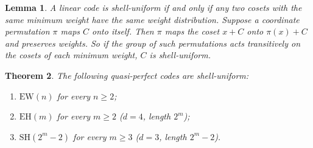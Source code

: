 \documentclass[11pt]{article}
\newtheorem{theorem}{Theorem}
\newtheorem{lemma}[theorem]{Lemma}
\theoremstyle{definition}
\theoremstyle{remark}
\begin{document}
\begin{lemma}\label{lem:coset}
A linear code is shell-uniform if and only if any two cosets with the same
minimum weight have the same weight distribution. Suppose a coordinate
permutation $\pi$ maps $C$ onto itself. Then $\pi$ maps the coset $x+C$ onto
$\pi(x)+C$ and preserves weights. So if the group of such permutations acts
transitively on the cosets of each minimum weight, $C$ is shell-uniform.
\end{lemma}

\begin{theorem}\label{thm:uniform}
The following quasi-perfect codes are shell-uniform:
\begin{enumerate}
\item $\mathrm{EW}(n)$ for every $n\ge 2$;
\item $\mathrm{EH}(m)$ for every $m\ge 2$ ($d=4$, length $2^m$);
\item $\mathrm{SH}(2^m-2)$ for every $m\ge 3$ ($d=3$, length $2^m-2$).
\end{enumerate}
\end{theorem}
\end{document}
